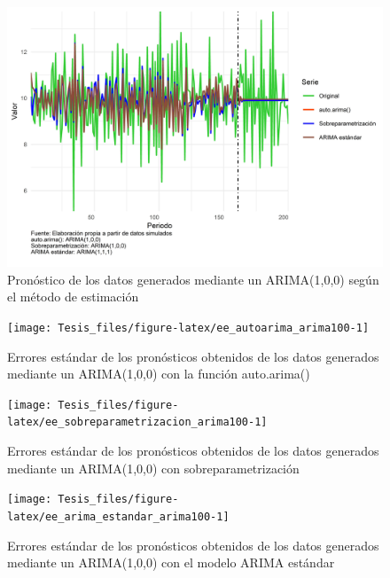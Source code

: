 \documentclass[
]{article}
\begin{document}
\begin{figure}[H]
\includegraphics[width=1\linewidth,height=1\textheight]{Tesis_files/figure-latex/pronostico_arima100-1} \caption{Pronóstico de los datos generados mediante un ARIMA(1,0,0) según el método de estimación}\label{fig:pronostico_arima100}
\end{figure}

\begin{figure}[H]
\texttt{[image: Tesis\_files/figure-latex/ee\_autoarima\_arima100-1]} \caption{Errores estándar de los pronósticos obtenidos de los datos generados mediante un ARIMA(1,0,0) con la función auto.arima()}\label{fig:ee_autoarima_arima100}
\end{figure}

\begin{figure}[H]
\texttt{[image: Tesis\_files/figure-latex/ee\_sobreparametrizacion\_arima100-1]} \caption{Errores estándar de los pronósticos obtenidos de los datos generados mediante un ARIMA(1,0,0) con sobreparametrización}\label{fig:ee_sobreparametrizacion_arima100}
\end{figure}

\begin{figure}[H]
\texttt{[image: Tesis\_files/figure-latex/ee\_arima\_estandar\_arima100-1]} \caption{Errores estándar de los pronósticos obtenidos de los datos generados mediante un ARIMA(1,0,0) con el modelo ARIMA estándar}\label{fig:ee_arima_estandar_arima100}
\end{figure}
\end{document}
